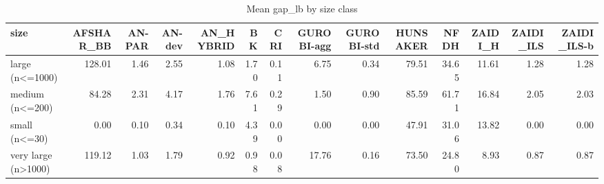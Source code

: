 \begin{table}[htbp]
\centering
\small
\caption{Mean gap\_lb by size class}
\label{tab:E10a_state_of_the_art_b10_by_size}
\begin{tabular}{lrrrrrrrrrrrrr}
\toprule
size & AFSHAR\_BB & AN-PAR & AN-dev & AN\_HYBRID & BK & CRI & GUROBI-agg & GUROBI-std & HUNSAKER & NFDH & ZAIDI\_H & ZAIDI\_ILS & ZAIDI\_ILS-b \\
\midrule
large (n<=1000) & 128.01 & 1.46 & 2.55 & 1.08 & 1.70 & 0.11 & 6.75 & 0.34 & 79.51 & 34.65 & 11.61 & 1.28 & 1.28 \\
medium (n<=200) & 84.28 & 2.31 & 4.17 & 1.76 & 7.61 & 0.29 & 1.50 & 0.90 & 85.59 & 61.71 & 16.84 & 2.05 & 2.03 \\
small (n<=30) & 0.00 & 0.10 & 0.34 & 0.10 & 4.39 & 0.00 & 0.00 & 0.00 & 47.91 & 31.06 & 13.82 & 0.00 & 0.00 \\
very large (n>1000) & 119.12 & 1.03 & 1.79 & 0.92 & 0.98 & 0.08 & 17.76 & 0.16 & 73.50 & 24.80 & 8.93 & 0.87 & 0.87 \\
\bottomrule
\end{tabular}
\end{table}
